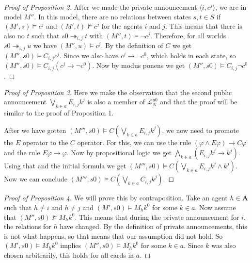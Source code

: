 \documentclass[a4paper, 10pt]{article}
\newcommand{\impl}{\rightarrow}
\newcommand{\A}{\mathbf{A}}
\begin{document}
\begin{proof}[Proof of Proposition 2]
    After we made the private announcement $\langle i, c^j\rangle$, we are
    in model $M''$. In this model, there are no relations between states
    $s, t \in S$ if $(M', s) \models c^j$ and $(M', t) \not \models c^j$
    for the agents $i$ and $j$. This means that there is also no $t$ such
    that $s0 \twoheadrightarrow_{i,j} t$ with $(M'', t) \models \neg c^j$.
    Therefore, for all worlds $s0 \twoheadrightarrow_{i,j} u$ we have
    $(M'', u) \models c^j$. By the definition of $C$ we get $(M'', s0)
    \models C_{i,j} c^j$. Since we also have $c^j \impl \neg c^0$, which
    holds in each state, so $(M'', s0) \models C_{i,j} (c^j \impl \neg
    c^0)$. Now by modus ponens we get $(M'', s0) \models C_{i,j} \neg c^0$.
\end{proof}

\begin{proof}[Proof of Proposition 3]
    Here we make the observation that the second public announcement
    $\bigvee_{k\in a} E_{i,j} k^j$ is also a member of
    $\mathcal{L}_N^{u0}$ and that the proof will be similar to the proof of
    Proposition 1.

    After we have gotten $(M''', s0) \models C\left(\bigvee_{k \in a }
        E_{i,j} k^j\right)$, we now need to promote the $E$ operator to the $C$
    operator. For this, we can use the rule $(\varphi \land E \varphi)
    \impl C \varphi$ and the rule $E \varphi \impl \varphi$. Now by
    propositional logic we get $\bigwedge_{k \in a} \left(E_{i,j}k^j \impl
        k^j\right)$. Using that and the initial formula we get $(M''', s0)
    \models C\left(\bigvee_{k \in a } E_{i,j} k^j \land k^j\right)$. Now we
    can conclude $(M''', s0) \models C\left(\bigvee_{k \in a} C_{i,j}
        k^j\right)$.
\end{proof}

\begin{proof}[Proof of Proposition 4]
    We will prove this by contraposition.
    Take an agent $h \in \A$ such that $h \not = i$ and $h \not = j$ and
    $(M', s0) \models M_h k^0$ for some $k \in a$. Now assume that $(M'',
    s0) \not \models M_h k^0$. This means that during the private
    announcement for $i$, the relations for $h$ have changed. By
    the definition of private announcements, this is not what happens, so
    that means that our assumption did not hold. So $(M', s0) \models M_h
    k^0$ implies $(M'', s0) \models M_h k^0$ for some $k \in a$. Since $k$
    was also chosen arbitrarily, this holds for all cards in $a$. 
\end{proof}
\end{document}
